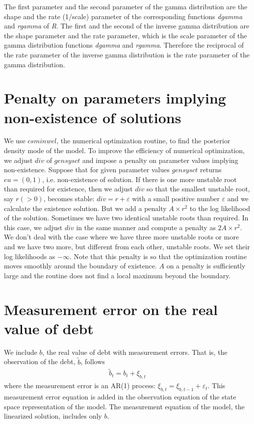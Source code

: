\documentclass[12pt,reqno,oneside]{amsart}
\theoremstyle{definition}
\theoremstyle{remark}
\newcommand{\eps}{\varepsilon}
\begin{document}
The first parameter and the second parameter of the gamma distribution are the shape and the rate (1/scale) parameter of the corresponding functions \textit{dgamma} and \textit{rgamma} of \textit{R}. The first and the second of the inverse gamma distribution are the shape parameter and the rate parameter, which is the scale parameter of the gamma distribution functions \textit{dgamma} and \textit{rgamma}. Therefore the reciprocal of the rate parameter of the inverse gamma distribution is the rate parameter of the gamma distribution.

\section{Penalty on parameters implying non-existence of solutions}

We use $csminwel$, the numerical optimization routine, to find the posterior density mode of the model. To improve the efficiency of numerical optimization, we adjust $div$ of $gensysct$ and impose a penalty on parameter values implying non-existence. Suppose that for given parameter values $gensysct$ returns $eu = (0,1)$, i.e. non-existence of solution. If there is one more unstable root than required for existence, then we adjust $div$ so that the smallest unstable root, say $r (>0)$, becomes stable: $div = r + \eps$ with a small positive number $\eps$ and we calculate the existence solution. But we add a penalty $A \times r^2$ to the log likelihood of the solution. Sometimes we have two identical unstable roots than required. In this case, we adjust $div$ in the same manner and compute a penalty as $2A \times r^2$. We don't deal with the case where we have three more unstable roots or more and we have two more, but different from each other, unstable roots. We set their log likelihoods as $-\infty$. Note that this penalty is so that the optimization routine moves smoothly around the boundary of existence. $A$ on a penalty is sufficiently large and the routine does not find a local maximum beyond the boundary.

\section{Measurement error on the real value of debt}

We include $b$, the real value of debt with measurement errors. That is, the observation of the debt, $\tilde b$, follows
\begin{gather}
\tilde b_{t} = b_{t} + \xi_{b,t}
\end{gather}
where the measurement error is an AR(1) process: $\xi_{b,t} = \xi_{b,t-1} + \eps_{t}$. This measurement error equation is added in the observation equation of the state space representation of the model. The measurement equation of the model, the linearized solution, includes only $b$.
\end{document}
